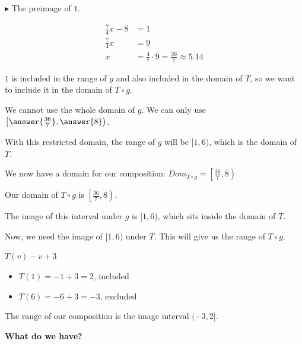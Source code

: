\documentclass{ximera}
\begin{document}
\begin{explanation}
$\blacktriangleright$ The preimage of $1$.





\begin{align*}
\frac{7}{4}x-8 &=   1 \\
\frac{7}{4}x   &=   9 \\
x              &=   \frac{4}{7} \cdot 9 = \frac{36}{7} \approx 5.14
\end{align*}


$1$ is included in the range of $g$ and also included in the domain of $T$, so we want to include it in the domain of $T \circ g$.


We cannot use the whole domain of $g$. We can only use $\left[ \answer{\frac{36}{7}}, \answer{8} \right)$.




With this restricted domain, the range of $g$ will be $[1, 6)$, which is the domain of $T$.

We now have a domain for our composition: $Dom_{T \circ g} = \left[\frac{36}{7}, 8\right)$

\end{explanation}















Our domain of $T \circ g$ is $\left[\frac{36}{7}, 8\right)$.

The image of this interval under $g$ is $[1,6)$, which sits inside the domain of $T$.


Now, we need the image of $[1,6)$ under $T$.  This will give us the range of $T \circ g$.



$T(v) -v + 3$

\begin{itemize}
\item $T(1) = -1+3 = 2$, included
\item $T(6) = -6+3 = -3$, excluded \\
\end{itemize}


The range of our composition is the image interval $(-3,2]$.




\textbf{What do we have?}
\end{document}
